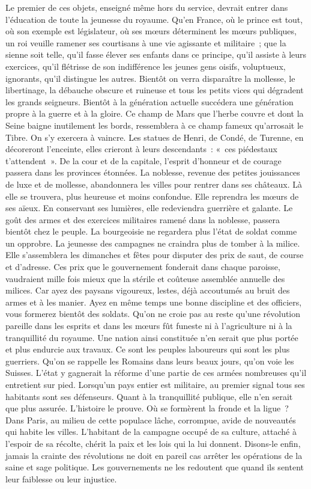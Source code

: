 \documentclass[french,twoside]{book} %
\begin{document}
Le premier de ces objets, enseigné même hors du service, devrait entrer dans l’éducation de toute la jeunesse du royaume. Qu’en France, où le prince est tout, où son exemple est législateur, où ses mœurs déterminent les mœurs publiques, un roi veuille ramener ses courtisans à une vie agissante et militaire ; que la sienne soit telle, qu’il fasse élever ses enfants dans ce principe, qu’il assiste à leurs exercices, qu’il flétrisse de son indifférence les jeunes gens oisifs, voluptueux, ignorants, qu’il distingue les autres. Bientôt on verra disparaître la mollesse, le libertinage, la débauche obscure et ruineuse et tous les petits vices qui dégradent les grands seigneurs. Bientôt à la génération actuelle succédera une génération propre à la guerre et à la gloire. Ce champ de Mars que l’herbe couvre et dont la Seine baigne inutilement les bords, ressemblera à ce champ fameux qu’arrosait le Tibre. On s’y exercera à vaincre. Les statues de Henri, de Condé, de Turenne, en décoreront l’enceinte, elles crieront à leurs descendants : « ces piédestaux t’attendent ». De la cour et de la capitale, l’esprit d’honneur et de courage passera dans les provinces étonnées. La noblesse, revenue des petites jouissances de luxe et de mollesse, abandonnera les villes pour rentrer dans ses châteaux. Là elle se trouvera, plus heureuse et moins confondue. Elle reprendra les mœurs de ses aïeux. En conservant ses lumières, elle redeviendra guerrière et galante. Le goût des armes et des exercices militaires ramené dans la noblesse, passera bientôt chez le peuple. La bourgeoisie ne regardera plus l’état de soldat comme un opprobre. La jeunesse des campagnes ne craindra plus de tomber à la milice. Elle s’assemblera les dimanches et fêtes pour disputer des prix de saut, de course et d’adresse. Ces prix que le gouvernement fonderait dans chaque paroisse, vaudraient mille fois mieux que la stérile et coûteuse assemblée annuelle des milices. Car ayez des paysans vigoureux, lestes, déjà accoutumés au bruit des armes et à les manier. Ayez en même temps une bonne discipline et des officiers, vous formerez bientôt des soldats. Qu’on ne croie pas au reste qu’une révolution pareille dans les esprits et dans les mœurs fût funeste ni à l’agriculture ni à la tranquillité du royaume. Une nation ainsi constituée n’en serait que plus portée et plus endurcie aux travaux. Ce sont les peuples laboureurs qui sont les plus guerriers. Qu’on se rappelle les Romains dans leurs beaux jours, qu’on voie les Suisses. L’état y gagnerait la réforme d’une partie de ces armées nombreuses qu’il entretient sur pied. Lorsqu’un pays entier est militaire, au premier signal tous ses habitants sont ses défenseurs. Quant à la tranquillité publique, elle n’en serait que plus assurée. L’histoire le prouve. Où se formèrent la fronde et la ligue ? Dans Paris, au milieu de cette populace lâche, corrompue, avide de nouveautés qui habite les villes. L’habitant de la campagne occupé de sa culture, attaché à l’espoir de sa récolte, chérit la paix et les lois qui la lui donnent. Disons-le enfin, jamais la crainte des révolutions ne doit en pareil cas arrêter les opérations de la saine et sage politique. Les gouvernements ne les redoutent que quand ils sentent leur faiblesse ou leur injustice.\par
\end{document}

